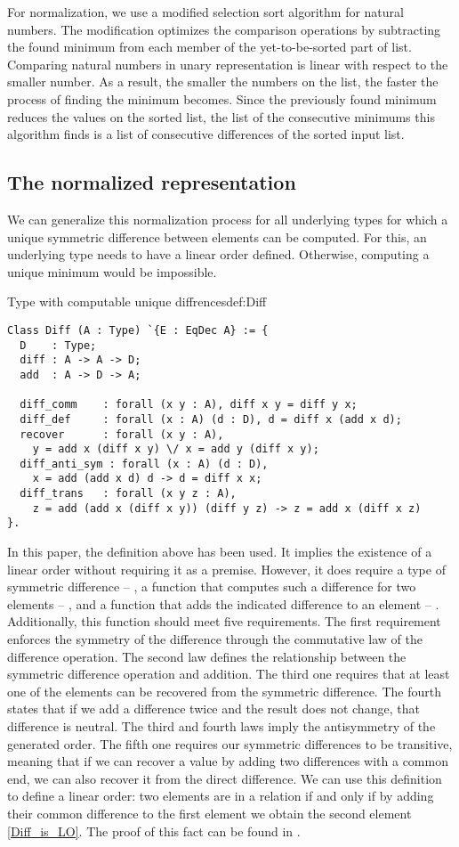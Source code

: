 For normalization, we use a modified selection sort algorithm for natural numbers. The modification optimizes the comparison operations by subtracting the found minimum from each member of the yet-to-be-sorted part of list. Comparing natural numbers in unary representation is linear with respect to the smaller number. As a result, the smaller the numbers on the list, the faster the process of finding the minimum becomes. Since the previously found minimum reduces the values on the sorted list, the list of the consecutive minimums this algorithm finds is a list of consecutive differences of the sorted input list.
\subsection{The normalized representation}
We can generalize this normalization process for all underlying types for which a unique symmetric difference between elements can be computed. For this, an underlying type needs to have a linear order defined. Otherwise, computing a unique minimum would be impossible.
\begin{defi}{Type with computable unique diffrences}{def:Diff}
\begin{verbatim}
Class Diff (A : Type) `{E : EqDec A} := {
  D    : Type;
  diff : A -> A -> D;
  add  : A -> D -> A;

  diff_comm    : forall (x y : A), diff x y = diff y x;
  diff_def     : forall (x : A) (d : D), d = diff x (add x d);
  recover      : forall (x y : A), 
    y = add x (diff x y) \/ x = add y (diff x y);
  diff_anti_sym : forall (x : A) (d : D), 
    x = add (add x d) d -> d = diff x x;
  diff_trans   : forall (x y z : A), 
    z = add (add x (diff x y)) (diff y z) -> z = add x (diff x z)
}.
\end{verbatim}
\end{defi}
In this paper, the definition above has been used. It implies the existence of a linear order without requiring it as a premise. However, it does require a type of symmetric difference -- , a function that computes such a difference for two elements -- , and a function that adds the indicated difference to an element -- . Additionally, this function should meet five requirements. The first requirement enforces the symmetry of the difference through the commutative law of the difference operation. The second law defines the relationship between the symmetric difference operation and addition. The third one requires that at least one of the elements can be recovered from the symmetric difference. The fourth states that if we add a difference twice and the result does not change, that difference is neutral. The third and fourth laws imply the antisymmetry of the generated order. The fifth one requires our symmetric differences to be transitive, meaning that if we can recover a value by adding two differences with a common end, we can also recover it from the direct difference. We can use this definition to define a linear order: two elements are in a relation if and only if by adding their common difference to the first element we obtain the second element \ref{Diff_is_LO}. The proof of this fact can be found in .

